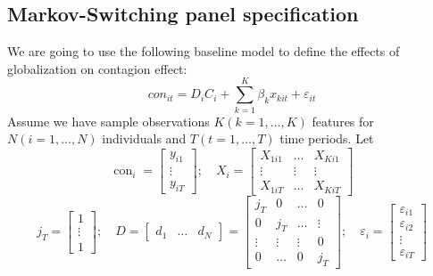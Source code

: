 \documentclass{article}
\begin{document}
\subsection*{Markov-Switching panel specification} 
We are going to use the following baseline model to define the effects of globalization on contagion effect:
\begin{equation}
\label{eq1}
con_{it} = D_{i} C_{i} + \sum_{k=1}^K \beta_{k} x_{kit} + \varepsilon_{it}
\end{equation}
Assume we have sample observations $K(k =1, …, K)$ features for $N(i =1, …, N)$ individuals and $T(t = 1, …, T)$ time periods. Let 
$$
\operatorname{con}_{i}=\left[\begin{array}{c}{y_{i 1}} \\ {\vdots} \\ {y_{i T}}\end{array}\right] ; \quad X_{i}=\left[\begin{array}{ccc}{X_{1 i 1}} & {\dots} & {X_{K i 1}} \\ {\vdots} & {\vdots} & {\vdots} \\ {X_{1 i T}} & {\dots} & {X_{K i T}}\end{array}\right]
$$
$$
j_{T}=\left[\begin{array}{l}{1} \\ {\vdots} \\ {1}\end{array}\right] ; \quad D=\left[\begin{array}{lll}{d_{1}} & {\ldots} & {d_{N}}\end{array}\right]=\left[\begin{array}{cccc}{j_{T}} & {0} & {\ldots} & {0} \\ {0} & {j_{T}} & {\ldots} & {\vdots} \\ {\vdots} & {\vdots} & {\vdots} & {0} \\ {0} & {\ldots} & {0} & {j_{T}}\end{array}\right] ; \quad \varepsilon_{i}=\left[\begin{array}{c}{\varepsilon_{i 1}} \\ {\varepsilon_{i 2}} \\ {\vdots} \\ {\varepsilon_{i T}}\end{array}\right]
$$
\end{document}
